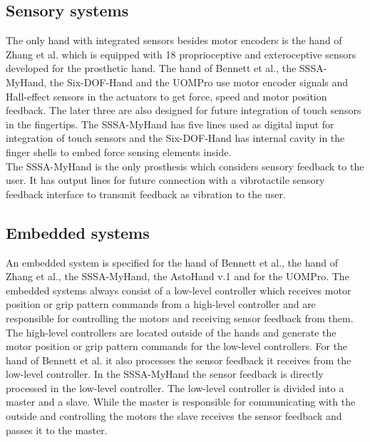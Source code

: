 \documentclass[a4paper, 10pt, conference]{ieeeconf}      %
\begin{document}
\subsection{Sensory systems}

The only hand with integrated sensors besides motor encoders is the hand of Zhang et al. which is equipped with 18 proprioceptive and exteroceptive sensors developed for the prosthetic hand. The hand of Bennett et al., the SSSA-MyHand, the Six-DOF-Hand and the UOMPro use motor encoder signals and Hall-effect sensors in the actuators to get force, speed and motor position feedback. The later three are also designed for future integration of touch sensors in the fingertips. The SSSA-MyHand has five lines used as digital input for integration of touch sensors and the Six-DOF-Hand has internal cavity in the finger shells to embed force sensing elements inside.\\
The SSSA-MyHand is the only prosthesis which considers sensory feedback to the user. It has output lines for future connection with a vibrotactile sensory feedback interface to transmit feedback as vibration to the user.

\subsection{Embedded systems}

An embedded system is specified for the hand of Bennett et al., the hand of Zhang et al., the SSSA-MyHand, the AstoHand v.1 and for the UOMPro. The embedded systems always consist of a low-level controller which receives motor position or grip pattern commands from a high-level controller and are responsible for controlling the motors and receiving sensor feedback from them. The high-level controllers are located outside of the hands and generate the motor position or grip pattern commands for the low-level controllers. For the hand of Bennett et al. it also processes the sensor feedback it receives from the low-level controller. In the SSSA-MyHand the sensor feedback is directly processed in the low-level controller. The low-level controller is divided into a master and a slave. While the master is responsible for communicating with the outside and controlling the motors the slave receives the sensor feedback and passes it to the master.

\newpage



%
\end{document}
